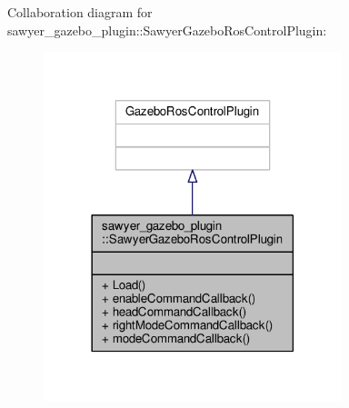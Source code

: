 Collaboration diagram for sawyer\-\_\-gazebo\-\_\-plugin\-:\-:Sawyer\-Gazebo\-Ros\-Control\-Plugin\-:\nopagebreak
\begin{figure}[H]
\begin{center}
\leavevmode
\includegraphics[width=246pt]{classsawyer__gazebo__plugin_1_1_sawyer_gazebo_ros_control_plugin__coll__graph}
\end{center}
\end{figure}
